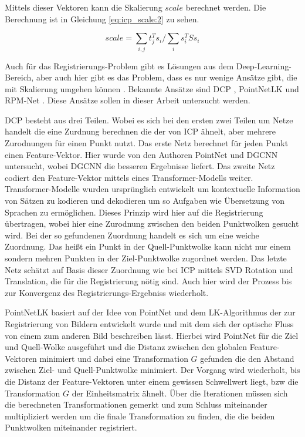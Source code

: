 \documentclass[12pt,titlepage, twoside]{article}
\begin{document}
Mittels dieser Vektoren kann die Skalierung $scale$ berechnet werden. Die Berechnung ist in Gleichung \ref{eq:icp_scale:2} zu sehen.

\begin{equation}
    \label{eq:icp_scale:2}
    scale = \sum_{i,j}{t_j^Ts_i} / \sum_{i}{s_i^TSs_i}
\end{equation}

Auch für das Registrierungs-Problem gibt es Lösungen aus dem Deep-Learning-Bereich, aber auch hier gibt es das Problem, dass es nur wenige Ansätze gibt, die mit Skalierung umgehen können \cite{ScaleLK}.
Bekannte Ansätze sind DCP \cite{Wang_2019_ICCV}, PointNetLK \cite{aoki2019pointnetlk} und RPM-Net \cite{Yew_2020}.
Diese Ansätze sollen in dieser Arbeit untersucht werden.

DCP besteht aus drei Teilen. Wobei es sich bei den ersten zwei Teilen um Netze handelt die eine Zurdnung berechnen die der von ICP ähnelt, aber mehrere Zurodnungen für einen Punkt nutzt.
Das erste Netz berechnet für jeden Punkt einen Feature-Vektor. Hier wurde von den Authoren PointNet und DGCNN untersucht, wobei DGCNN die besseren Ergebnisse liefert. 
Das zweite Netz codiert den Feature-Vektor mittels eines Transformer-Modells weiter. 
Transformer-Modelle wurden ursprünglich entwickelt um kontextuelle Information von Sätzen zu kodieren und dekodieren um so Aufgaben wie Übersetzung von Sprachen zu ermöglichen. 
Dieses Prinzip wird hier auf die Registrierung übertragen, wobei hier eine Zurodnung zwischen den beiden Punktwolken gesucht wird.
Bei der so gefundenen Zuordnung handelt es sich um eine weiche Zuordnung. Das heißt ein Punkt in der Quell-Punktwolke kann nicht nur einem sondern mehren Punkten in der Ziel-Punktwolke zugordnet werden.
Das letzte Netz schätzt auf Basis dieser Zuordnung wie bei ICP mittels SVD Rotation und Translation, die für die Registrierung nötig sind.
Auch hier wird der Prozess bis zur Konvergenz des Registrierungs-Ergebniss wiederholt.

PointNetLK basiert auf der Idee von PointNet und dem LK-Algorithmus \cite{lk} der zur Registrierung von Bildern entwickelt wurde und mit dem sich der optische Fluss von einem zum anderen Bild beschreiben lässt. 
Hierbei wird PointNet für die Ziel und Quell-Wolke ausgeführt und die Distanz zwischen den globalen Feature-Vektoren minimiert und 
dabei eine Transformation $G$ gefunden die den Abstand zwischen Ziel- und Quell-Punktwolke minimiert.
Der Vorgang wird wiederholt, bis die Distanz der Feature-Vektoren unter einem gewissen Schwellwert liegt, bzw die Transformation $G$ der Einheitsmatrix ähnelt.
Über die Iterationen müssen sich die berechneten Transformationen gemerkt und zum Schluss miteinander multipliziert werden um die finale Transformation zu finden, die die beiden Punktwolken miteinander registriert.
\end{document}

